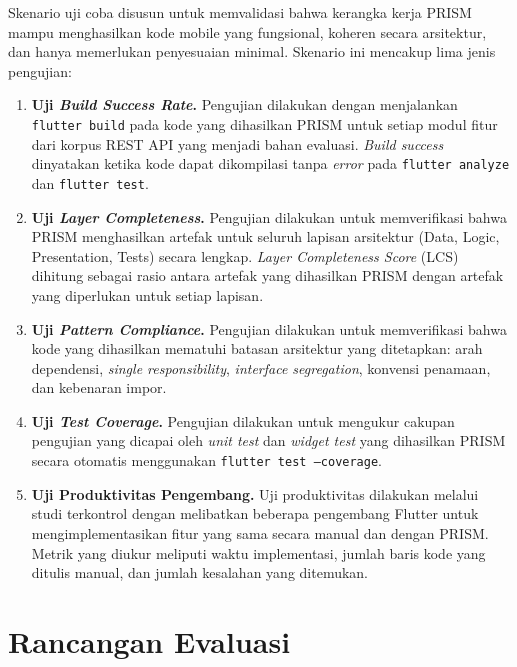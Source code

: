 Skenario uji coba disusun untuk memvalidasi bahwa kerangka kerja PRISM mampu menghasilkan kode mobile yang fungsional, koheren secara arsitektur, dan hanya memerlukan penyesuaian minimal. Skenario ini mencakup lima jenis pengujian:

\begin{enumerate}
    \item \textbf{Uji \textit{Build Success Rate}.} Pengujian dilakukan dengan menjalankan \texttt{flutter build} pada kode yang dihasilkan PRISM untuk setiap modul fitur dari korpus REST API yang menjadi bahan evaluasi. \textit{Build success} dinyatakan ketika kode dapat dikompilasi tanpa \textit{error} pada \texttt{flutter analyze} dan \texttt{flutter test}.
    
    \item \textbf{Uji \textit{Layer Completeness}.} Pengujian dilakukan untuk memverifikasi bahwa PRISM menghasilkan artefak untuk seluruh lapisan arsitektur (Data, Logic, Presentation, Tests) secara lengkap. \textit{Layer Completeness Score} (LCS) dihitung sebagai rasio antara artefak yang dihasilkan PRISM dengan artefak yang diperlukan untuk setiap lapisan.
    
    \item \textbf{Uji \textit{Pattern Compliance}.} Pengujian dilakukan untuk memverifikasi bahwa kode yang dihasilkan mematuhi batasan arsitektur yang ditetapkan: arah dependensi, \textit{single responsibility}, \textit{interface segregation}, konvensi penamaan, dan kebenaran impor.
    
    \item \textbf{Uji \textit{Test Coverage}.} Pengujian dilakukan untuk mengukur cakupan pengujian yang dicapai oleh \textit{unit test} dan \textit{widget test} yang dihasilkan PRISM secara otomatis menggunakan \texttt{flutter test --coverage}.
    
    \item \textbf{Uji Produktivitas Pengembang.} Uji produktivitas dilakukan melalui studi terkontrol dengan melibatkan beberapa pengembang Flutter untuk mengimplementasikan fitur yang sama secara manual dan dengan PRISM. Metrik yang diukur meliputi waktu implementasi, jumlah baris kode yang ditulis manual, dan jumlah kesalahan yang ditemukan.
\end{enumerate}

\section{Rancangan Evaluasi}

